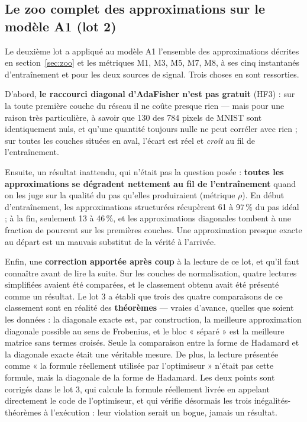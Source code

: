\documentclass[11pt,a4paper]{article}
\begin{document}
\subsection{Le zoo complet des approximations sur le modèle A1 (lot 2)}
\label{sec:lot2}

Le deuxième lot a appliqué au modèle A1 l'ensemble des approximations décrites en
section~\ref{sec:zoo} et les métriques M1, M3, M5, M7, M8, à ses cinq instantanés d'entraînement et
pour les deux sources de signal. Trois choses en sont ressorties.

D'abord, \textbf{le raccourci diagonal d'AdaFisher n'est pas gratuit} (HF3) : sur la toute première
couche du réseau il ne coûte presque rien — mais pour une raison très particulière, à savoir que
130 des 784 pixels de MNIST sont identiquement nuls, et qu'une quantité toujours nulle ne peut
corréler avec rien ; sur toutes les couches situées en aval, l'écart est réel et \emph{croît} au fil
de l'entraînement.

Ensuite, un résultat inattendu, qui n'était pas la question posée : \textbf{toutes les
approximations se dégradent nettement au fil de l'entraînement} quand on les juge sur la qualité du
pas qu'elles produiraient (métrique $\rho$). En début d'entraînement, les approximations structurées
récupèrent 61 à 97\,\% du pas idéal ; à la fin, seulement 13 à 46\,\%, et les approximations
diagonales tombent à une fraction de pourcent sur les premières couches. Une approximation presque
exacte au départ est un mauvais substitut de la vérité à l'arrivée.

Enfin, une \textbf{correction apportée après coup} à la lecture de ce lot, et qu'il faut connaître
avant de lire la suite. Sur les couches de normalisation, quatre lectures simplifiées avaient été
comparées, et le classement obtenu avait été présenté comme un résultat. Le lot 3 a établi que
trois des quatre comparaisons de ce classement sont en réalité des \textbf{théorèmes} — vraies
d'avance, quelles que soient les données : la diagonale exacte est, par construction, la meilleure
approximation diagonale possible au sens de Frobenius, et le bloc « séparé » est la meilleure
matrice sans termes croisés. Seule la comparaison entre la forme de Hadamard et la diagonale exacte
était une véritable mesure. De plus, la lecture présentée comme « la formule réellement utilisée par
l'optimiseur » n'était pas cette formule, mais la diagonale de la forme de Hadamard. Les deux points
sont corrigés dans le lot 3, qui calcule la formule réellement livrée en appelant directement le
code de l'optimiseur, et qui vérifie désormais les trois inégalités-théorèmes à l'exécution : leur
violation serait un bogue, jamais un résultat.
\end{document}
